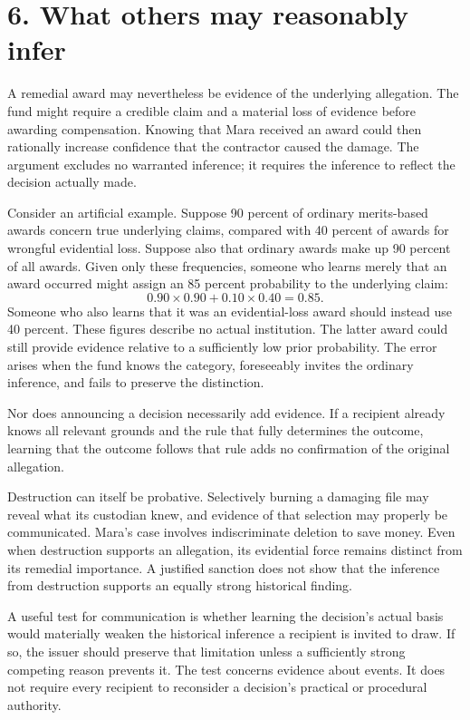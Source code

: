 \section*{6. What others may reasonably infer}

A remedial award may nevertheless be evidence of the underlying allegation. The fund might require a credible claim and a material loss of evidence before awarding compensation. Knowing that Mara received an award could then rationally increase confidence that the contractor caused the damage. The argument excludes no warranted inference; it requires the inference to reflect the decision actually made.

Consider an artificial example. Suppose 90 percent of ordinary merits-based awards concern true underlying claims, compared with 40 percent of awards for wrongful evidential loss. Suppose also that ordinary awards make up 90 percent of all awards. Given only these frequencies, someone who learns merely that an award occurred might assign an 85 percent probability to the underlying claim:
\[
0.90 \times 0.90 + 0.10 \times 0.40 = 0.85.
\]
Someone who also learns that it was an evidential-loss award should instead use 40 percent. These figures describe no actual institution. The latter award could still provide evidence relative to a sufficiently low prior probability. The error arises when the fund knows the category, foreseeably invites the ordinary inference, and fails to preserve the distinction.

Nor does announcing a decision necessarily add evidence. If a recipient already knows all relevant grounds and the rule that fully determines the outcome, learning that the outcome follows that rule adds no confirmation of the original allegation.

Destruction can itself be probative. Selectively burning a damaging file may reveal what its custodian knew, and evidence of that selection may properly be communicated. Mara’s case involves indiscriminate deletion to save money. Even when destruction supports an allegation, its evidential force remains distinct from its remedial importance. A justified sanction does not show that the inference from destruction supports an equally strong historical finding.

A useful test for communication is whether learning the decision’s actual basis would materially weaken the historical inference a recipient is invited to draw. If so, the issuer should preserve that limitation unless a sufficiently strong competing reason prevents it. The test concerns evidence about events. It does not require every recipient to reconsider a decision’s practical or procedural authority.

